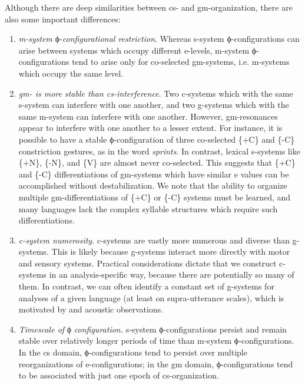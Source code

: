 Although there are deep similarities between cs- and gm-or\-ga\-ni\-za\-tion, there are also some important differences: 

\begin{enumerate}
\item \textit{m-system} ϕ-\textit{configurational restriction}. Whereas s-system ϕ-configurations can arise between systems which occupy different e-levels, m-system ϕ-configurations tend to arise only for co-selected gm-systems, i.e. m-sys\-tems which occupy the same level. 

\item \textit{gm- is more stable than cs-interference}. Two c-systems which  with the same s-system can interfere with one another, and two g-systems which  with the same m-system can interfere with one another. However, gm-resonances appear to interfere with one another to a lesser extent. For instance, it is possible to have a stable ϕ-configuration of three co-selected \{+C\} and \{-C\} constriction gestures, as in the word \textit{sprints}. In contrast, lexical s-systems like \{+N\}, \{-N\}, and \{V\} are almost never co-selected. This suggests that \{+C\} and \{-C\} differentiations of gm-systems which have similar e values can be accomplished without destabilization. We note that the ability to organize multiple gm-differentiations of \{+C\} or \{-C\} systems must be learned, and many languages lack the complex syllable structures which require such differentiations.

\item \textit{c-system numerosity}. c-systems are vastly more numerous and diverse than g-systems. This is likely because g-systems interact more directly with motor and sensory systems. Practical considerations dictate that we construct c-systems in an analysis-specific way, because there are potentially so many of them. In contrast, we can often identify a constant set of g-systems for analyses of a given language (at least on supra-utterance scales), which is motivated  by  and acoustic observations.

\item  \textit{Timescale of} ϕ \textit{configuration.} s-system ϕ-configurations persist and remain stable over relatively longer periods of time than m-system ϕ-con\-fig\-u\-ra\-tions. In the cs domain, ϕ-configurations tend to persist over multiple reorganizations of e-configurations; in the gm domain, ϕ-configurations tend to be associated with just one epoch of cs-organization.
\end{enumerate}

